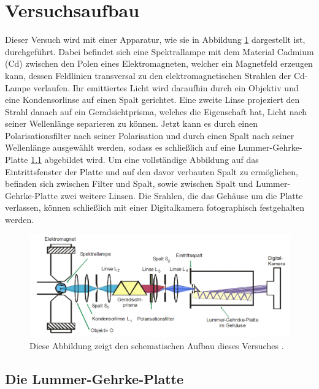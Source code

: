 \section{Versuchsaufbau}
\label{sec:Versuchsaufbau}

Dieser Versuch wird mit einer Apparatur, wie sie in 
Abbildung \ref{abb1} dargestellt ist, durchgeführt.
Dabei befindet sich eine Spektrallampe mit dem Material 
Cadmium (Cd) zwischen den Polen eines Elektromagneten, 
welcher ein Magnetfeld erzeugen kann, dessen Feldlinien 
transversal zu den elektromagnetischen Strahlen der 
Cd-Lampe verlaufen.
Ihr emittiertes Licht wird daraufhin durch ein Objektiv und 
eine Kondensorlinse auf einen Spalt gerichtet. Eine zweite 
Linse projeziert den Strahl danach auf ein Geradsichtprisma, 
welches die Eigenschaft hat, Licht nach seiner 
Wellenlänge separieren zu können. Jetzt kann es durch einen 
Polarisationsfilter nach seiner Polarisation und durch einen 
Spalt nach seiner Wellenlänge ausgewählt werden, sodass es 
schließlich auf eine Lummer-Gehrke-Platte \ref{LGP} abgebildet 
wird. Um eine vollständige Abbildung auf das Eintrittsfenster
der Platte und auf den davor verbauten Spalt zu ermöglichen, 
befinden sich zwischen Filter und Spalt, sowie zwischen 
Spalt und Lummer-Gehrke-Platte zwei weitere Linsen. 
Die Srahlen, die das Gehäuse um die Platte verlassen,
können schließlich mit einer Digitalkamera fotographisch 
festgehalten werden.

\begin{figure}
    \centering
    \includegraphics[width=\textwidth]{figure/Aufbau.pdf}
    \caption{Diese Abbildung zeigt den schematischen Aufbau dieses Versuches \cite{sample}.}
    \label{abb1}
\end{figure}

\subsection{Die Lummer-Gehrke-Platte}
\label{LGP}

